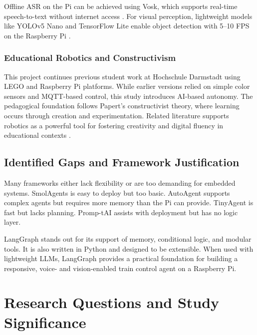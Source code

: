 Offline ASR on the Pi can be achieved using Vosk, which supports real-time speech-to-text without internet access \cite{vosk2023api}. For visual perception, lightweight models like YOLOv5 Nano and TensorFlow Lite enable object detection with 5–10 FPS on the Raspberry Pi \cite{lin2022realtime,tan2023lightweightcv}.


\subsubsection{Educational Robotics and Constructivism}

This project continues previous student work at Hochschule Darmstadt using LEGO and Raspberry Pi platforms. While earlier versions relied on simple color sensors and MQTT-based control, this study introduces AI-based autonomy. The pedagogical foundation follows Papert’s \cite{papert1980mindstorms} constructivist theory, where learning occurs through creation and experimentation. Related literature supports robotics as a powerful tool for fostering creativity and digital fluency in educational contexts \cite{resnick2009kindergarten,bers2020coding}.

\subsection{Identified Gaps and Framework Justification}

Many frameworks either lack flexibility or are too demanding for embedded systems. SmolAgents is easy to deploy but too basic. AutoAgent supports complex agents but requires more memory than the Pi can provide. TinyAgent is fast but lacks planning. Promp-tAI assists with deployment but has no logic layer.

LangGraph stands out for its support of memory, conditional logic, and modular tools. It is also written in Python and designed to be extensible. When used with lightweight LLMs, LangGraph provides a practical foundation for building a responsive, voice- and vision-enabled train control agent on a Raspberry Pi.

\section{Research Questions and Study Significance}
\label{sec:background:third_subsection:researchquestions}

